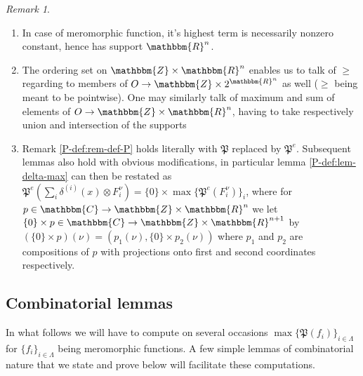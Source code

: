 \documentclass{article}
\theoremstyle{remark}
\newtheorem{remark}[proposition]{Remark}
\begin{document}
\begin{remark}
  
  \begin{enumerate}
    \item In case of meromorphic function, it's highest term is necessarily
    nonzero constant, hence has support $\mathbbm{R}^n$.
    
    \item The ordering set on $\mathbbm{Z} \times \mathbbm{R}^n$ enables us to
    talk of $\geqslant$ regarding to members of $O \rightarrow \mathbbm{Z}
    \times 2^{\mathbbm{R}^n}$ as well ($\geqslant$ being meant to be
    pointwise). One may similarly talk of maximum and sum of elements of $O
    \rightarrow \mathbbm{Z} \times \mathbbm{R}^n$, having to take respectively
    union and intersection of the supports
    
    \item Remark \ref{P-def:rem-def-P} holds literally with $\mathfrak{P}$
    replaced by $\mathfrak{P}^e$. Subsequent lemmas also hold with obvious
    modifications, in particular lemma \ref{P-def:lem-delta-max} can then be
    restated as $\mathfrak{P}^e \left( \sum_i \delta^{(i)} (x) \otimes
    F_i^{\nu} \right) = \{ 0 \} \times \max \{ \mathfrak{P}^e (F_i^{\nu})
    \}_i$, where for $p \in \mathbbm{C} \rightarrow \mathbbm{Z} \times
    \mathbbm{R}^n$ we let $\{ 0 \} \times p \in \mathbbm{C} \rightarrow
    \mathbbm{Z} \times \mathbbm{R}^{n + 1}$ by $(\{ 0 \} \times p) (\nu) =
    (p_1 (\nu), \{ 0 \} \times p_2 (\nu))$ where $p_1$ and $p_2$ are
    compositions of $p$ with projections onto first and second coordinates
    respectively.
  \end{enumerate}
\end{remark}

\subsection{Combinatorial lemmas}

In what follows we will have to compute on several occasions $\max \{
\mathfrak{P} (f_i) \}_{i \in \Lambda}$ for $\{ f_i \}_{i \in \Lambda}$ being
meromorphic functions. A few simple lemmas of combinatorial nature that we
state and prove below will facilitate these computations.
\end{document}

